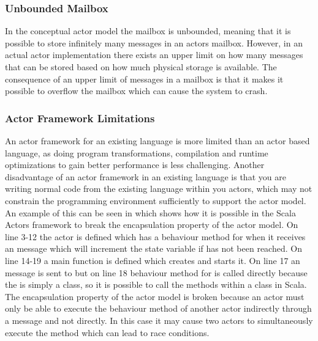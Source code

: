 \subsubsection{Unbounded Mailbox}
In the conceptual actor model the mailbox is unbounded, meaning that it is possible to store infinitely many messages in an actors mailbox. However, in an actual actor implementation there exists an upper limit on how many messages that can be stored based on how much physical storage is available. The consequence of an upper limit of messages in a mailbox is that it makes it possible to overflow the mailbox which can cause the system to crash\cite[p. 152]{sevenModels}.

\subsubsection{Actor Framework Limitations}
An actor framework for an existing language is more limited than an actor based language, as doing program transformations, compilation and runtime optimizations to gain better performance is less challenging\cite[p. 5]{karmani2011actors}. Another disadvantage of an actor framework in an existing language is that you are writing normal code from the existing language within you actors, which may not constrain the programming environment sufficiently to support the actor model. An example of this can be seen in  which shows how it is possible in the Scala Actors framework to break the encapsulation property of the actor model. On line 3-12 the  actor is defined which has a behaviour method for when it receives an  message which will increment the state variable  if  has not been reached. On line 14-19 a main function is defined which creates  and starts it. On line 17 an  message is sent to  but on line 18 behaviour method for  is called directly because the  is simply a class, so it is possible to call the methods within a class in Scala. The encapsulation property of the actor model is broken because an actor must only be able to execute the behaviour method of another actor indirectly through a message and not directly. In this case it may cause two actors to simultaneously execute the  method which can lead to race conditions. 

